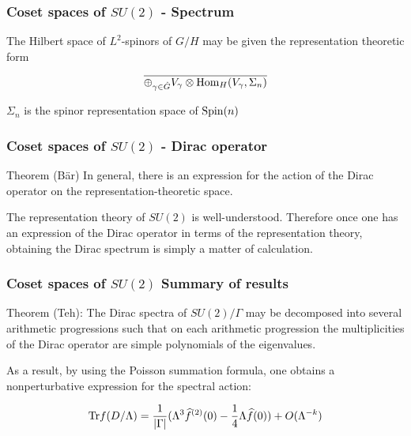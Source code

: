 \documentclass{beamer}
\def\Hom{{\rm Hom}}
\def\Spin{{\rm Spin}}
\def\Tr{{\rm Tr}}
\begin{document}
\begin{frame}
	\frametitle{Coset spaces of $SU(2)$ - Spectrum}
	\begin{block}{}
		The Hilbert space of $L^2$-spinors of $G/H$ may be given the representation theoretic form

		\[
			\overline{\oplus_{\gamma \in \hat{G}} V_{\gamma} \otimes \Hom_{H}(V_{\gamma}, \Sigma_{n})}
		\]
	\end{block}

	\pause

	\begin{block}{}
		$\Sigma_{n}$ is the spinor representation space of $\Spin(n)$
	\end{block}
\end{frame}

\begin{frame}
	\frametitle{Coset spaces of $SU(2)$ - Dirac operator}
	\begin{block}{Theorem (B\"ar)}
		In general, there is an expression for the action of the Dirac operator on the representation-theoretic space.
	\end{block}

	\begin{block}{}
		The representation theory of $SU(2)$ is well-understood. Therefore once one has an expression of the Dirac operator in terms of the representation theory, obtaining the Dirac spectrum is simply a matter of calculation.
	\end{block}
\end{frame}

\begin{frame}
	\frametitle{Coset spaces of $SU(2)$ Summary of results}
	Theorem (Teh):
	The Dirac spectra of $SU(2) / \Gamma$ may be decomposed into several arithmetic progressions such that on each arithmetic progression the multiplicities of the Dirac operator are simple polynomials of the eigenvalues.

	As a result, by using the Poisson summation formula, one obtains a nonperturbative expression for the spectral action:

	\[
	\Tr f(D/\Lambda) = \frac{1}{|\Gamma|}(\Lambda^3 \widehat{f}^{(2)}(0) -\frac{1}{4} \Lambda \widehat{f}(0)) + O(\Lambda^{-k})
	\]
\end{frame}
\end{document}
